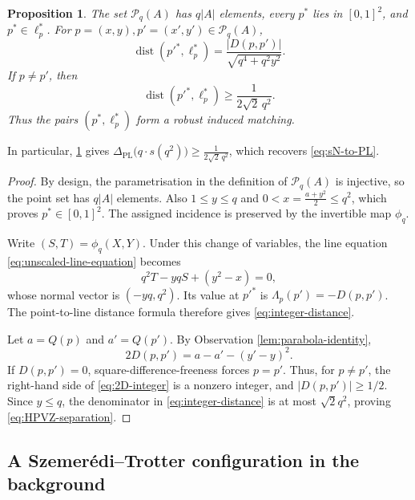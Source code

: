 \documentclass[11pt,reqno]{amsart}
\newtheorem{proposition}[proposition]{Proposition}
\theoremstyle{definition}
\theoremstyle{remark}
\newcommand{\dist}{\operatorname{dist}}
\newcommand{\PL}{\Delta_{\mathrm{PL}}}
\begin{document}
\begin{proposition}
\label{prop:HPVZ-matching}
The set $\mathcal P_q(A)$ has $q|A|$ elements, every $p^*$ lies in
$[0,1]^2$, and $p^*\in\ell_p^*$.  For
$p=(x,y),p'=(x',y')\in\mathcal P_q(A)$,
\begin{equation}
\label{eq:integer-distance}
        \dist(p'^*,\ell_p^*)
        =
        \frac{|D(p,p')|}{\sqrt{q^4+q^2y^2}}.
\end{equation}
If $p\ne p'$, then
\begin{equation}
\label{eq:HPVZ-separation}
        \dist(p'^*,\ell_p^*)
        \ge\frac{1}{2\sqrt2\,q^2}.
\end{equation}
Thus the pairs $(p^*,\ell_p^*)$ form a robust induced matching.
\end{proposition}

In particular, \cref{prop:HPVZ-matching} gives $\PL\bigl(q \cdot s(q^2)\bigr)\ge\frac{1}{2\sqrt2\,q^2}$, which recovers \eqref{eq:sN-to-PL}.

\begin{proof}
By design, the parametrisation in the definition of $\mathcal P_q(A)$ is injective, so the point set has $q|A|$ elements.  Also
$1\le y\le q$ and $0<x=\frac{a+y^2}{2}\le q^2$, which proves $p^*\in[0,1]^2$.  The assigned incidence is preserved by
the invertible map $\phi_q$.

Write $(S,T)=\phi_q(X,Y)$.  Under this change of variables, the line
equation \eqref{eq:unscaled-line-equation} becomes
\[
        q^2T-yqS+(y^2-x)=0,
\]
whose normal vector is $(-yq,q^2)$.  Its value at $p'^*$ is
$\Lambda_p(p')=-D(p,p')$.  The point-to-line distance formula therefore
gives \eqref{eq:integer-distance}.

Let $a=Q(p)$ and $a'=Q(p')$.  By Observation \ref{lem:parabola-identity},
\begin{equation}
\label{eq:2D-integer}
        2D(p,p')=a-a'-(y'-y)^2.
\end{equation}
If $D(p,p')=0$, square-difference-freeness forces $p=p'$.  Thus, for $p\ne p'$, the right-hand side
of \eqref{eq:2D-integer} is a nonzero integer, and
$|D(p,p')|\ge1/2$.  Since $y\le q$, the denominator in
\eqref{eq:integer-distance} is at most $\sqrt2q^2$, proving
\eqref{eq:HPVZ-separation}.
\end{proof}

\subsection{A Szemer\'edi--Trotter configuration in the background}
\end{document}
